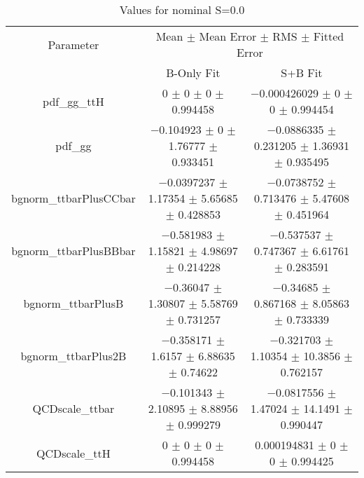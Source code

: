\begin{table}
\centering
\caption{Values for nominal S=0.0}
\begin{tabular}{ccc}
\toprule
Parameter & \multicolumn{2}{c}{Mean $\pm$ Mean Error $\pm$ RMS $\pm$ Fitted Error}\\
 & B-Only Fit & S+B Fit\\
\midrule
pdf\_gg\_ttH & \num{0} $\pm$ \num{0} $\pm$ \num{0} $\pm$ \num{0.994458} & \num{-0.000426029} $\pm$ \num{0} $\pm$ \num{0} $\pm$ \num{0.994454}\\
pdf\_gg & \num{-0.104923} $\pm$ \num{0} $\pm$ \num{1.76777} $\pm$ \num{0.933451} & \num{-0.0886335} $\pm$ \num{0.231205} $\pm$ \num{1.36931} $\pm$ \num{0.935495}\\
bgnorm\_ttbarPlusCCbar & \num{-0.0397237} $\pm$ \num{1.17354} $\pm$ \num{5.65685} $\pm$ \num{0.428853} & \num{-0.0738752} $\pm$ \num{0.713476} $\pm$ \num{5.47608} $\pm$ \num{0.451964}\\
bgnorm\_ttbarPlusBBbar & \num{-0.581983} $\pm$ \num{1.15821} $\pm$ \num{4.98697} $\pm$ \num{0.214228} & \num{-0.537537} $\pm$ \num{0.747367} $\pm$ \num{6.61761} $\pm$ \num{0.283591}\\
bgnorm\_ttbarPlusB & \num{-0.36047} $\pm$ \num{1.30807} $\pm$ \num{5.58769} $\pm$ \num{0.731257} & \num{-0.34685} $\pm$ \num{0.867168} $\pm$ \num{8.05863} $\pm$ \num{0.733339}\\
bgnorm\_ttbarPlus2B & \num{-0.358171} $\pm$ \num{1.6157} $\pm$ \num{6.88635} $\pm$ \num{0.74622} & \num{-0.321703} $\pm$ \num{1.10354} $\pm$ \num{10.3856} $\pm$ \num{0.762157}\\
QCDscale\_ttbar & \num{-0.101343} $\pm$ \num{2.10895} $\pm$ \num{8.88956} $\pm$ \num{0.999279} & \num{-0.0817556} $\pm$ \num{1.47024} $\pm$ \num{14.1491} $\pm$ \num{0.990447}\\
QCDscale\_ttH & \num{0} $\pm$ \num{0} $\pm$ \num{0} $\pm$ \num{0.994458} & \num{0.000194831} $\pm$ \num{0} $\pm$ \num{0} $\pm$ \num{0.994425}\\
\bottomrule
\end{tabular}
\end{table}